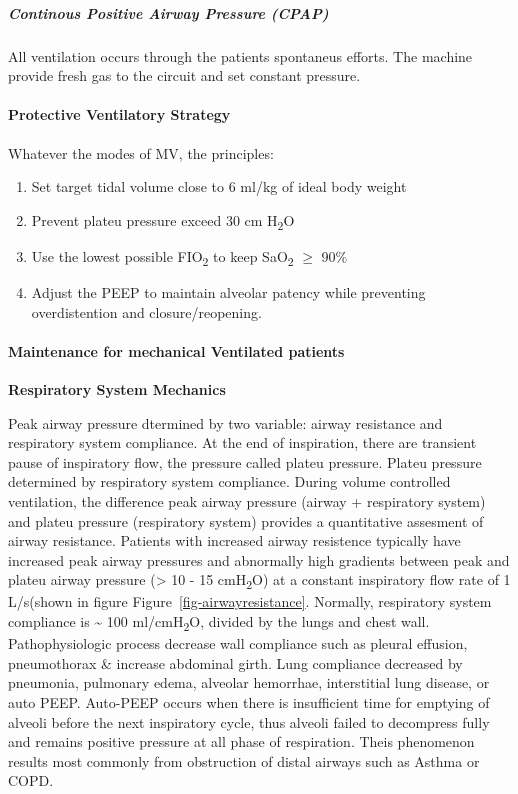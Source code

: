 \documentclass[
  letterpaper,
  DIV=11,
  numbers=noendperiod]{scrreprt}
\let\oldparagraph\paragraph
\renewcommand{\paragraph}[1]{\oldparagraph{#1}\mbox{}}
\let\oldsubparagraph\subparagraph
\renewcommand{\subparagraph}[1]{\oldsubparagraph{#1}\mbox{}}
\providecommand{\tightlist}{%
  \setlength{\itemsep}{0pt}\setlength{\parskip}{0pt}}\usepackage{longtable,booktabs,array}
\begin{document}
\subparagraph{Continous Positive Airway Pressure
(CPAP)}\label{continous-positive-airway-pressure-cpap}

All ventilation occurs through the patients spontaneus efforts. The
machine provide fresh gas to the circuit and set constant pressure.

\paragraph{Protective Ventilatory
Strategy}\label{protective-ventilatory-strategy}

Whatever the modes of MV, the principles:

\begin{enumerate}
\def\labelenumi{\arabic{enumi}.}
\tightlist
\item
  Set target tidal volume close to 6 ml/kg of ideal body weight
\item
  Prevent plateu pressure exceed 30 cm H\textsubscript{2}O
\item
  Use the lowest possible FIO\textsubscript{2} to keep
  SaO\textsubscript{2} \(\ge\) 90\%
\item
  Adjust the PEEP to maintain alveolar patency while preventing
  overdistention and closure/reopening.
\end{enumerate}

\paragraph{Maintenance for mechanical Ventilated
patients}\label{maintenance-for-mechanical-ventilated-patients}

\textbf{Respiratory System Mechanics}

Peak airway pressure dtermined by two variable: airway resistance and
respiratory system compliance. At the end of inspiration, there are
transient pause of inspiratory flow, the pressure called plateu
pressure. Plateu pressure determined by respiratory system compliance.
During volume controlled ventilation, the difference peak airway
pressure (airway + respiratory system) and plateu pressure (respiratory
system) provides a quantitative assesment of airway resistance. Patients
with increased airway resistence typically have increased peak airway
pressures and abnormally high gradients between peak and plateu airway
pressure (\textgreater{} 10 - 15 cmH\textsubscript{2}O) at a constant
inspiratory flow rate of 1 L/s(shown in figure
Figure~\ref{fig-airwayresistance}. Normally, respiratory system
compliance is \textasciitilde{} 100 ml/cmH\textsubscript{2}O, divided by
the lungs and chest wall. Pathophysiologic process decrease wall
compliance such as pleural effusion, pneumothorax \& increase abdominal
girth. Lung compliance decreased by pneumonia, pulmonary edema, alveolar
hemorrhae, interstitial lung disease, or auto PEEP. Auto-PEEP occurs
when there is insufficient time for emptying of alveoli before the next
inspiratory cycle, thus alveoli failed to decompress fully and remains
positive pressure at all phase of respiration. Theis phenomenon results
most commonly from obstruction of distal airways such as Asthma or COPD.
\end{document}
